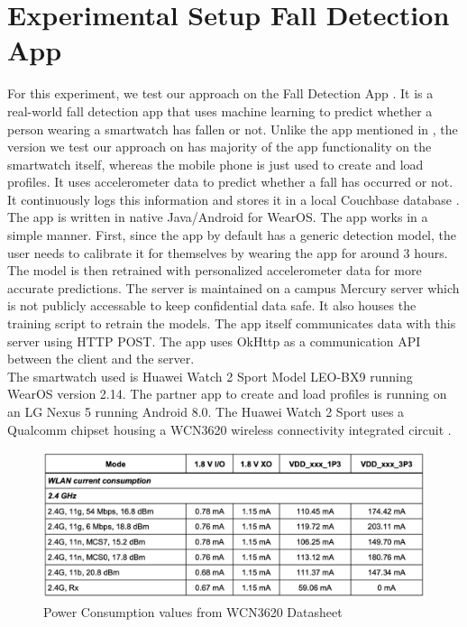 \section{Experimental Setup \textemdash Fall Detection App}
For this experiment, we test our approach on the Fall Detection App \cite{falld}. It is a real-world fall detection app 
that uses machine learning to predict whether a person wearing a smartwatch has fallen or not. Unlike the app mentioned in 
\cite{falld}, the version we test our approach on has majority of the app functionality on the smartwatch itself, whereas the 
mobile phone is just used to create and load profiles. It uses accelerometer data to predict whether a fall has occurred or not. 
It continuously logs this information and stores it in a local Couchbase database \cite{couchbase}. The app is written in 
native Java/Android for WearOS. The app works in a simple manner. First, since the app by default has a generic detection 
model, the user needs to calibrate it for themselves by wearing the app for around 3 hours. The model is then retrained with 
personalized accelerometer data for more accurate predictions. The server is maintained on a campus Mercury server \cite{mercury} which 
is not publicly accessable to keep confidential data safe. It also houses the training script to retrain the models. The app itself 
communicates data with this server using HTTP POST. The app uses OkHttp \cite{ok} as a communication API between the client and the server.\\
The smartwatch used is Huawei Watch 2 Sport Model LEO-BX9 running WearOS version 2.14. The partner app to create and load profiles 
is running on an LG Nexus 5 running Android 8.0. The Huawei Watch 2 Sport uses a Qualcomm chipset housing a WCN3620 wireless 
connectivity integrated circuit \cite{wcn3620}. \\

\begin{figure}
    \begin{center}
        \includegraphics[scale=0.35]{Figs/wcndatasheet.png}    
    \end{center}
    \caption{Power Consumption values from WCN3620 Datasheet \cite{wcn3620}}
    \label{fig:wcn}
\end{figure}

